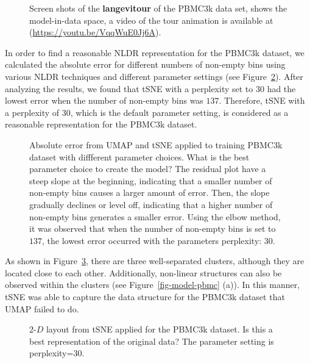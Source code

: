 \documentclass[
  12pt]{article}
\begin{document}
\begin{figure}[H]
\caption{\label{fig-pbmc1-sc}Screen shots of the \textbf{langevitour} of
the PBMC3k data set, shows the model-in-data space, a video of the tour
animation is available at (\url{https://youtu.be/VqqWuE0Jj6A}).}

\end{figure}%

In order to find a reasonable NLDR representation for the PBMC3k
dataset, we calculated the absolute error for different numbers of
non-empty bins using various NLDR techniques and different parameter
settings (see Figure~\ref{fig-pbmc-abserror}). After analyzing the
results, we found that tSNE with a perplexity set to \(30\) had the
lowest error when the number of non-empty bins was \(137\). Therefore,
tSNE with a perplexity of \(30\), which is the default parameter
setting, is considered as a reasonable representation for the PBMC3k
dataset.

\begin{figure}[H]


\caption{\label{fig-pbmc-abserror}Absolute error from UMAP and tSNE
applied to training PBMC3k dataset with diffferent parameter choices.
What is the best parameter choice to create the model? The residual plot
have a steep slope at the beginning, indicating that a smaller number of
non-empty bins causes a larger amount of error. Then, the slope
gradually declines or level off, indicating that a higher number of
non-empty bins generates a smaller error. Using the elbow method, it was
observed that when the number of non-empty bins is set to \(137\), the
lowest error occurred with the parameters perplexity: \(30\).}

\end{figure}%

As shown in Figure~\ref{fig-tsne-suggest}, there are three
well-separated clusters, although they are located close to each other.
Additionally, non-linear structures can also be observed within the
clusters (see Figure~\ref{fig-model-pbmc} (a)). In this manner, tSNE was
able to capture the data structure for the PBMC3k dataset that UMAP
failed to do.

\begin{figure}[H]


\caption{\label{fig-tsne-suggest}\(2\text{-}D\) layout from tSNE applied
for the PBMC3k dataset. Is this a best representation of the original
data? The parameter setting is perplexity=30.}

\end{figure}%
\end{document}
